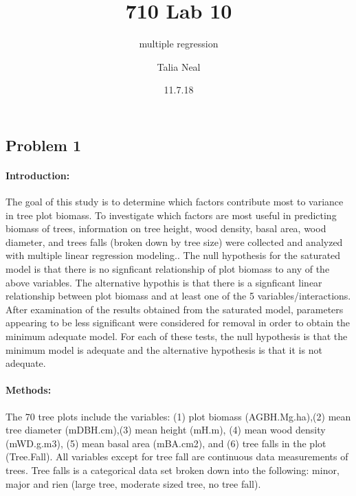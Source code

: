 \documentclass[]{article}
\title{710 Lab 10}
\subtitle{multiple regression}
\author{Talia Neal}
\date{11.7.18}
\let\oldparagraph\paragraph
\renewcommand{\paragraph}[1]{\oldparagraph{#1}\mbox{}}
\begin{document}
\maketitle

\subsection{Problem 1}\label{problem-1}

\paragraph{Introduction:}\label{introduction}

The goal of this study is to determine which factors contribute most to
variance in tree plot biomass. To investigate which factors are most
useful in predicting biomass of trees, information on tree height, wood
density, basal area, wood diameter, and trees falls (broken down by tree
size) were collected and analyzed with multiple linear regression
modeling.. The null hypothesis for the saturated model is that there is
no signficant relationship of plot biomass to any of the above
variables. The alternative hypothis is that there is a signficant linear
relationship between plot biomass and at least one of the 5
variables/interactions. After examination of the results obtained from
the saturated model, parameters appearing to be less significant were
considered for removal in order to obtain the minimum adequate model.
For each of these tests, the null hypothesis is that the minimum model
is adequate and the alternative hypothesis is that it is not adequate.

\paragraph{Methods:}\label{methods}

The 70 tree plots include the variables: (1) plot biomass
(AGBH.Mg.ha),(2) mean tree diameter (mDBH.cm),(3) mean height (mH.m),
(4) mean wood density (mWD.g.m3), (5) mean basal area (mBA.cm2), and (6)
tree falls in the plot (Tree.Fall). All variables except for tree fall
are continuous data measurements of trees. Tree falls is a categorical
data set broken down into the following: minor, major and rien (large
tree, moderate sized tree, no tree fall).
\end{document}
